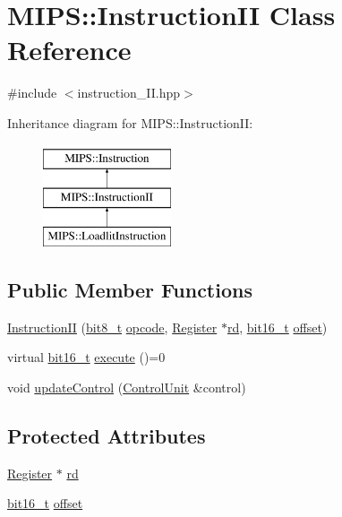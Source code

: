 \hypertarget{classMIPS_1_1InstructionII}{}\section{M\+I\+PS\+:\+:Instruction\+II Class Reference}
\label{classMIPS_1_1InstructionII}


{\ttfamily \#include $<$instruction\+\_\+\+I\+I.\+hpp$>$}

Inheritance diagram for M\+I\+PS\+:\+:Instruction\+II\+:\begin{figure}[H]
\begin{center}
\leavevmode
\includegraphics[height=3.000000cm]{classMIPS_1_1InstructionII}
\end{center}
\end{figure}
\subsection*{Public Member Functions}
\begin{DoxyCompactItemize}
\item 
\hyperlink{classMIPS_1_1InstructionII_a0f84efe08b176134df068fed51aca447}{Instruction\+II} (\hyperlink{core_8hpp_a6074bae122ae7b527864eec42c728c3c}{bit8\+\_\+t} \hyperlink{classMIPS_1_1Instruction_a45cc6808b5dde8a5d41067d148b55476}{opcode}, \hyperlink{classMIPS_1_1Register}{Register} $\ast$\hyperlink{classMIPS_1_1InstructionII_a2a709b8170f2bf653de2102df9403e1f}{rd}, \hyperlink{core_8hpp_adc265a970bc35995b5879784bbb3f1b7}{bit16\+\_\+t} \hyperlink{classMIPS_1_1InstructionII_ae34cdcf18cd37944dfecb96d5b07b5cb}{offset})
\item 
virtual \hyperlink{core_8hpp_adc265a970bc35995b5879784bbb3f1b7}{bit16\+\_\+t} \hyperlink{classMIPS_1_1InstructionII_aa014c5b0fe877746ca4db85c971a2e93}{execute} ()=0
\item 
void \hyperlink{classMIPS_1_1InstructionII_a6d59324f70d5b0eac26c771032ef6293}{update\+Control} (\hyperlink{classMIPS_1_1ControlUnit}{Control\+Unit} \&control)
\end{DoxyCompactItemize}
\subsection*{Protected Attributes}
\begin{DoxyCompactItemize}
\item 
\hyperlink{classMIPS_1_1Register}{Register} $\ast$ \hyperlink{classMIPS_1_1InstructionII_a2a709b8170f2bf653de2102df9403e1f}{rd}
\item 
\hyperlink{core_8hpp_adc265a970bc35995b5879784bbb3f1b7}{bit16\+\_\+t} \hyperlink{classMIPS_1_1InstructionII_ae34cdcf18cd37944dfecb96d5b07b5cb}{offset}
\end{DoxyCompactItemize}


